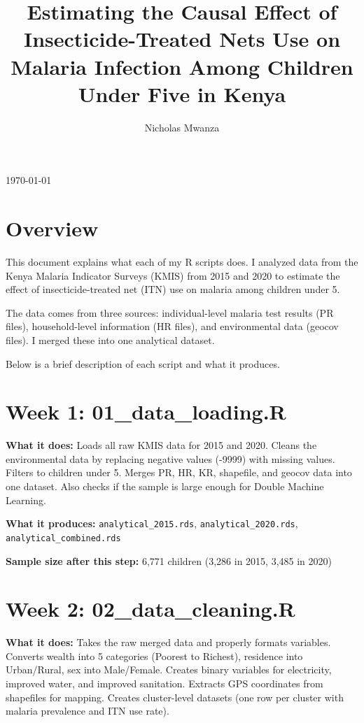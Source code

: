 \documentclass[11pt]{article}
\title{Estimating the Causal Effect of Insecticide-Treated Nets Use on Malaria Infection Among Children Under Five in Kenya}
\author{Nicholas Mwanza}
\begin{document}
	\maketitle
	\today
	
	\section*{Overview}
	
	This document explains what each of my R scripts does. I analyzed data from the Kenya Malaria Indicator Surveys (KMIS) from 2015 and 2020 to estimate the effect of insecticide-treated net (ITN) use on malaria among children under 5.
	
	The data comes from three sources: individual-level malaria test results (PR files), household-level information (HR files), and environmental data (geocov files). I merged these into one analytical dataset.
	
	Below is a brief description of each script and what it produces.
	
	\section*{Week 1: 01\_data\_loading.R}
	
	\textbf{What it does:} Loads all raw KMIS data for 2015 and 2020. Cleans the environmental data by replacing negative values (-9999) with missing values. Filters to children under 5. Merges PR, HR, KR, shapefile, and geocov data into one dataset. Also checks if the sample is large enough for Double Machine Learning.
	
	\textbf{What it produces:} \texttt{analytical\_2015.rds}, \texttt{analytical\_2020.rds}, \texttt{analytical\_combined.rds}
	
	\textbf{Sample size after this step:} 6,771 children (3,286 in 2015, 3,485 in 2020)
	
	\section*{Week 2: 02\_data\_cleaning.R}
	
	\textbf{What it does:} Takes the raw merged data and properly formats variables. Converts wealth into 5 categories (Poorest to Richest), residence into Urban/Rural, sex into Male/Female. Creates binary variables for electricity, improved water, and improved sanitation. Extracts GPS coordinates from shapefiles for mapping. Creates cluster-level datasets (one row per cluster with malaria prevalence and ITN use rate).
	
\end{document}

